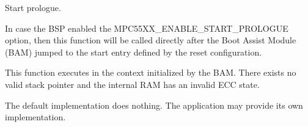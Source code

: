 Start prologue. 

In case the B\+SP enabled the M\+P\+C55\+X\+X\+\_\+\+E\+N\+A\+B\+L\+E\+\_\+\+S\+T\+A\+R\+T\+\_\+\+P\+R\+O\+L\+O\+G\+UE option, then this function will be called directly after the Boot Assist Module (B\+AM) jumped to the start entry defined by the reset configuration.

This function executes in the context initialized by the B\+AM. There exists no valid stack pointer and the internal R\+AM has an invalid E\+CC state.

The default implementation does nothing. The application may provide its own implementation. 